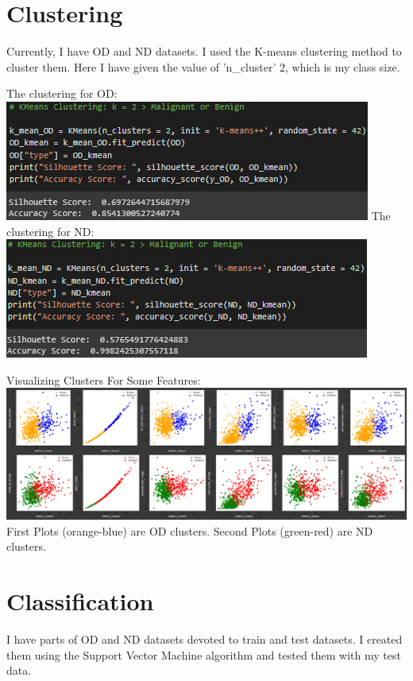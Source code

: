 \documentclass[a4 paper]{article}
\begin{document}
\section{Clustering}
    Currently, I have OD and ND datasets. I used the K-means clustering method to cluster them. Here I have given the value of 'n\_cluster' 2, which is my class size.
    \begin{multicols}{2}
        \noindent The clustering for OD:
        \newline\includegraphics[scale=0.65]{cluster-od.png}
        The clustering for ND:
        \newline\includegraphics[scale=0.65]{cluster-nd.png}
    \end{multicols}
    \noindent Visualizing Clusters For Some Features:
    \newline \includegraphics[scale=0.5]{clusters.png}
    \newline First Plots (orange-blue) are OD clusters. Second Plots (green-red) are ND clusters.

\section{Classification}
    I have parts of OD and ND datasets devoted to train and test datasets. I created them using the Support Vector Machine algorithm and tested them with my test data.
\end{document}
